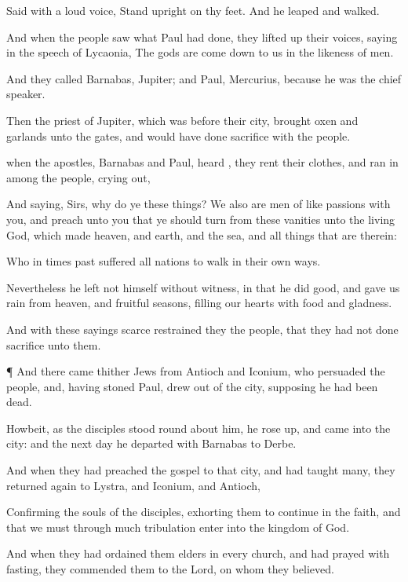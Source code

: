 {Said with a
loud
voice,
Stand
upright
on
thy
feet.
And he
leaped
and
walked.

And
when the
people
saw
what
Paul had
done, they lifted
up
their
voices,
saying in the speech of
Lycaonia, The
gods are come
down
to
us in the
likeness of
men.

And they
called
Barnabas,
Jupiter;
and
Paul,
Mercurius,
because
he
was the
chief
speaker.

Then the
priest of
Jupiter, which
was
before
their
city,
brought
oxen
and
garlands
unto the
gates, and would
have done
sacrifice
with the
people.

when the
apostles,
Barnabas
and
Paul,
heard
{}, they
rent
their
clothes, and ran
in
among the
people, crying
out,

And
saying,
Sirs,
why do
ye these
things?
We
also
are
men of like
passions with
you, and
preach unto
you that ye should
turn
from
these
vanities
unto the
living
God,
which
made
heaven,
and
earth,
and the
sea,
and all
things that are
therein:

Who
in
times
past
suffered
all
nations to walk
in their
own
ways.

Nevertheless he
left
not
himself without
witness, in that he did
good, and
gave
us
rain from
heaven,
and
fruitful seasons,
filling
our
hearts with
food
and
gladness.

And with
these
sayings
scarce restrained
they the
people, that they
had
not done
sacrifice unto
them.


\par }{\PP {}¶
And there came
thither
{}
Jews
from
Antioch
and
Iconium,
who
persuaded the
people,
and, having
stoned
Paul,
drew
{} out
of the
city,
supposing
he had been
dead.

Howbeit, as the
disciples stood round
about
him, he rose
up, and
came
into the
city:
and the next
day he
departed
with
Barnabas
to
Derbe.

And when they had preached the
gospel to
that
city,
and had
taught
many, they returned
again
to
Lystra,
and
{}
Iconium,
and
Antioch,

Confirming the
souls of the
disciples,
{} exhorting
them to
continue in the
faith,
and
that
we
must
through
much
tribulation
enter
into the
kingdom of
God.

And when they had
ordained
them
elders in
every
church, and had
prayed
with
fasting, they
commended
them to the
Lord,
on
whom they
believed.

}
